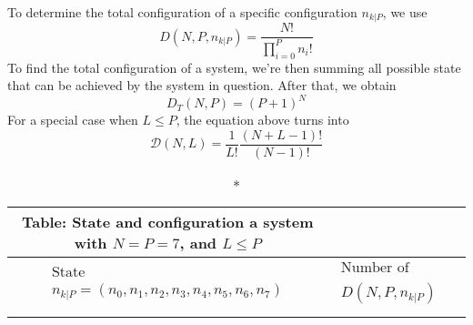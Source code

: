 \documentclass[../../../Main.tex]{subfiles}
\begin{document}
To determine the total configuration of a specific configuration $n_{k|P}$, we use
\begin{equation*}
    D(N,P,n_{k|P})=\frac{N!}{\displaystyle\prod_{i=0}^{P}n_i!}
\end{equation*}
To find the total configuration of a system, we're then summing all possible state that can be achieved by the system in question. After that, we obtain
\begin{equation*}
    D_T(N,P)=(P+1)^N
\end{equation*}
For a special case when $L\leq P$, the equation above turns into
\begin{equation*}
\mathcal{D}(N,L)=\frac{1}{L!}\frac{(N+L-1)!}{(N-1)!}
\end{equation*}

\begin{longtable}{c||c}
    \caption*{Table: State and configuration a system with $N=P=7$}, and $L\leq P$\\
    \hline\hline
    $\begin{array}{c}\text{State} \\n_{k|P}=(n_0,n_1,n_2, n_3, n_4, n_5, n_6, n_7)\end{array}$&$\begin{array}{c}\text{Number of configuration}\\  D(N,P,n_{k|P})\end{array}$\\ 
    \hline\hline\\


\end{longtable}
\end{document}
